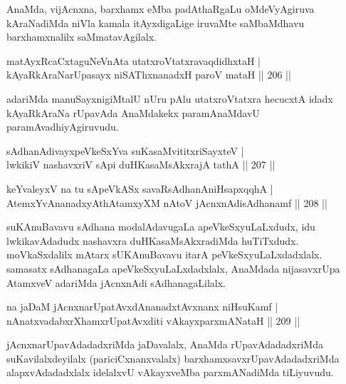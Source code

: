 \begin{artha}%
AnaMda, vijAcnxna, barxhamx eMba padAthaRgaLu oMdeVyAgiruva kAraNadiMda niVla kamala itAyxdigaLige iruvaMte saMbaMdhavu barxhamxnalilx saMmatavAgilalx.
\end{artha}

\begin{shl}
matAyxRcaCxtaguNeVnAta utatxroVtatxravaqdidhxtaH |\\
kAyaRkAraNarUpasayx niSAThx\s \s nanadxH paroV mataH \hfill || 206 ||
\end{shl}

\begin{artha}
adariMda manuSayxnigiMtalU nUru pAlu utatxroVtatxra hecucxtA idadx kAyaRkAraNa rUpavAda AnaMdakekx paramAnaMdavU paramAvadhiyAgiruvudu.
\end{artha}


\begin{shl}
sAdhanAdivayxpeVkeSxYva suKasaMvititxriSayxteV |\\
lwkikiV nashavxriV sA\s pi duHKasaMsAkxrajA tathA \hfill || 207 ||
\end{shl}

\begin{shl}
keYvaleyxV na tu sApeVkASx savaRsAdhanAniHsapxqqhA |\\
AtemxYvA\s \s nanadxyAthAtamxyXM nAtoV jAcnxnAdisAdhanamf \hfill || 208 ||
\end{shl}

\begin{artha}
suKAnuBavavu sAdhana modalAdavugaLa apeVkeSxyuLaLxdudx, idu lwkikavAdadudx nashavxra duHKasaMsAkxradiMda huTiTxdudx. moVkaSxdalilx mAtarx sUKAnuBavavu itarA peVkeSxyuLaLxdadxlalx. samasatx sAdhanagaLa apeVkeSxyuLaLxdadxlalx, AnaMdada nijasavxrUpa AtamxveV adariMda jAcnxnAdi sAdhanagaLilalx.
\end{artha}

\begin{shl}
na jaDaM jAcnxnarUpatAvxdAnanadxtAvxnanx niHsuKamf |\\
nAnatxvadabxrXhamxrUpatAvxditi vAkayxparxmANataH \hfill || 209 ||
\end{shl}

\begin{artha}%
jAcnxnarUpavAdadadxriMda jaDavalalx, AnaMda rUpavAdadadxriMda suKavilalxdeyilalx (pariciCxnanxvalalx) barxhamxsavxrUpavAdadadxriMda alapxvAdadadxlalx idelalxvU vAkayxveMba parxmANadiMda tiLiyuvudu.
\end{artha}

